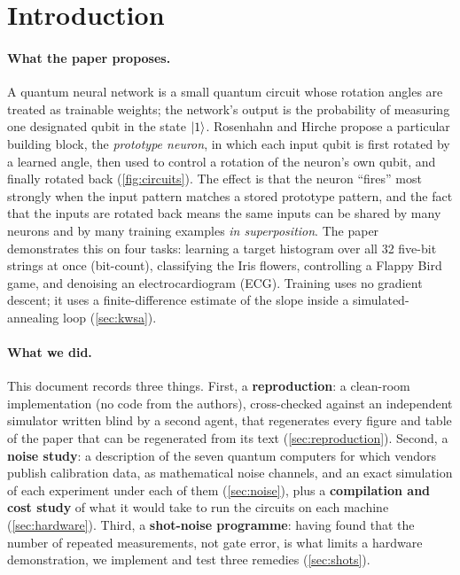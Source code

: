 \section{Introduction}
\label{sec:intro}

\paragraph{What the paper proposes.}
A quantum neural network is a small quantum circuit whose rotation angles are treated as
trainable weights; the network's output is the probability of measuring one designated qubit in
the state $\lvert 1 \rangle$.  Rosenhahn and Hirche \cite{ptqnn} propose a particular building block,
the \emph{prototype neuron}, in which each input qubit is first rotated by a learned angle, then
used to control a rotation of the neuron's own qubit, and finally rotated back
(\cref{fig:circuits}).  The effect is that the neuron ``fires'' most strongly when the input
pattern matches a stored prototype pattern, and the fact that the inputs are rotated back means
the same inputs can be shared by many neurons and by many training examples \emph{in
superposition}.  The paper demonstrates this on four tasks: learning a target histogram over all
32 five-bit strings at once (bit-count), classifying the Iris flowers, controlling a Flappy Bird
game, and denoising an electrocardiogram (ECG).  Training uses no gradient descent; it uses a
finite-difference estimate of the slope inside a simulated-annealing loop (\cref{sec:kwsa}).

\paragraph{What we did.}
This document records three things.  First, a \textbf{reproduction}: a clean-room implementation
(no code from the authors), cross-checked against an independent simulator written blind by a
second agent, that regenerates every figure and table of the paper that can be regenerated from
its text (\cref{sec:reproduction}).  Second, a \textbf{noise study}: a description of the seven
quantum computers for which vendors publish calibration data, as mathematical noise channels, and
an exact simulation of each experiment under each of them (\cref{sec:noise}), plus a
\textbf{compilation and cost study} of what it would take to run the circuits on each machine
(\cref{sec:hardware}).  Third, a \textbf{shot-noise programme}: having found that the number of
repeated measurements, not gate error, is what limits a hardware demonstration, we implement and
test three remedies (\cref{sec:shots}).

